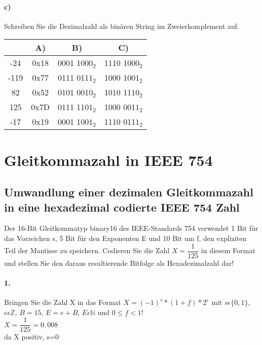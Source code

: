 \documentclass[paper=a4, fontsize=11pt]{scrartcl}
\numberwithin{equation}{section}
\numberwithin{figure}{section}
\numberwithin{table}{section}
\begin{document}
\paragraph{c)}
Schreiben Sie die Dezimalzahl als binären String im Zweierkomplement auf. \\

\begin{tabular}{|c|c|c|c|}
\hline
 & A) & B) & C) \\
\hline 
-24 & 0x18 & 0001 100$0_{2}$ & 1110 100$0_{2}$ \\
\hline
-119  & 0x77 & 0111 011$1_{2}$ & 1000 100$1_{2}$ \\
\hline
82   & 0x52 & 0101 001$0_{2}$ & 1010 111$0_{2}$ \\
\hline
125  & 0x7D & 0111 110$1_{2}$ & 1000 001$1_{2}$ \\
\hline
-17   & 0x19 & 0001 100$1_{2}$ & 1110 011$1_{2}$ \\
\hline
\end{tabular}


\section{Gleitkommazahl in IEEE 754 }

\subsection{Umwandlung einer dezimalen Gleitkommazahl in eine hexadezimal codierte IEEE 754 Zahl}

Der 16-Bit Gleitkommatyp binary16 des IEEE-Standards 754 verwendet 1 Bit für das Vorzeichen s, 5 Bit für den Exponenten E und 10 Bit um f, den expliziten Teil der Mantisse zu speichern. Codieren Sie die Zahl $X=\dfrac{1}{125}$ in diesem Format und stellen Sie den daraus resultierende Bitfolge als Hexadezimalzahl dar! \\

\paragraph{1.}
Bringen Sie die Zahl X in das Format $X=(-1)^{s}*(1+f)*2^{e}$ mit $s \epsilon \{0,1 \}$, $e \epsilon \mathbb{Z}$, $B=15$, $E=e+B$, $E \epsilon \mathbb{N}$ und $0 \leqslant f < 1$! \\

$X=\dfrac{1}{125}=0,008$ \\
da X positiv, s=0 \\
\end{document}
